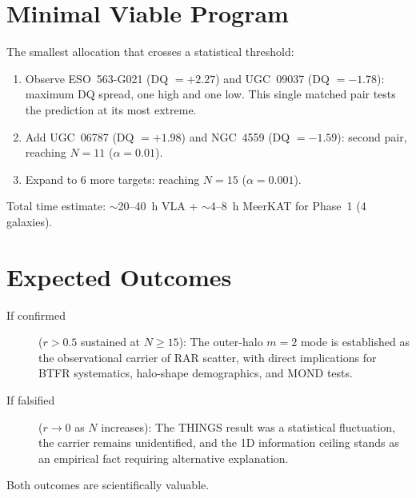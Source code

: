\documentclass[11pt]{article}
\newcommand{\mtwo}{m{=}2}
\begin{document}
\section{Minimal Viable Program}

The smallest allocation that crosses a statistical threshold:

\begin{enumerate}
\item Observe ESO~563-G021 (DQ $= +2.27$) and UGC~09037 (DQ $= -1.78$): maximum DQ spread, one high and one low. This single matched pair tests the prediction at its most extreme.
\item Add UGC~06787 (DQ $= +1.98$) and NGC~4559 (DQ $= -1.59$): second pair, reaching $N = 11$ ($\alpha = 0.01$).
\item Expand to 6 more targets: reaching $N = 15$ ($\alpha = 0.001$).
\end{enumerate}

Total time estimate: $\sim$20--40~h VLA + $\sim$4--8~h MeerKAT for Phase~1 (4 galaxies).

\section{Expected Outcomes}

\begin{description}
\item[If confirmed] ($r > 0.5$ sustained at $N \geq 15$): The outer-halo $\mtwo$ mode is established as the observational carrier of RAR scatter, with direct implications for BTFR systematics, halo-shape demographics, and MOND tests.
\item[If falsified] ($r \to 0$ as $N$ increases): The THINGS result was a statistical fluctuation, the carrier remains unidentified, and the 1D information ceiling stands as an empirical fact requiring alternative explanation.
\end{description}

Both outcomes are scientifically valuable.
\end{document}
